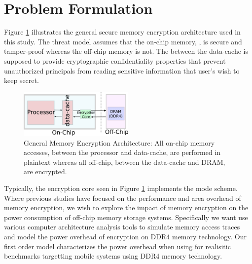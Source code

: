 \section{Problem Formulation}
\label{sec-problem}


Figure \ref{fig:sys-arch} illustrates the general secure memory encryption
architecture used in this study. The threat model assumes that the
on-chip memory, , is secure and tamper-proof whereas the
off-chip memory is not. The  between the data-cache is
supposed to provide cryptographic confidentiality properties that prevent
unauthorized principals from reading sensitive information that user's wish to
keep secret.

\begin{figure}[!htb]
  \centering
  \includegraphics[width=0.5\textwidth]{figs/sys-arch}
  \caption{General Memory Encryption Architecture: All on-chip memory accesses,
  between the processor and data-cache, are performed in plaintext whereas all
  off-chip, between the data-cache and DRAM, are encrypted.}
  \label{fig:sys-arch}
\end{figure}

Typically, the encryption core seen in Figure \ref{fig:sys-arch} implements the
 mode scheme.  Where previous studies have focused on the
performance and area overhead of memory encryption, we wish to explore the
impact of memory encryption on the power consumption of off-chip memory storage
systems. Specifically we want use various computer architecture analysis tools
to simulate memory access traces and model the power overhead of encryption on
DDR4 memory technology. Our first order model characterizes the  power
overhead when using  for realisitic benchmarks
targetting mobile systems using DDR4 memory technology.
